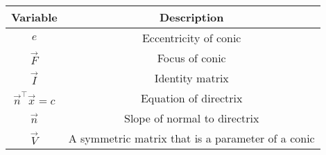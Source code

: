 \begin{tabular}[12pt]{ |c| c|}
    \hline
    \textbf{Variable} & \textbf{Description}\\ 
    \hline
	$e$ & Eccentricity of conic\\
	\hline
	$\vec{F}$ & Focus of conic\\
	\hline
	$\vec{I}$ & Identity matrix\\
	\hline
	$\vec{n}^{\top}\vec{x}=c$ & Equation of directrix\\
	\hline
	$\vec{n}$ & Slope of normal to directrix\\
	\hline
	$\vec{V}$ & A symmetric matrix that is a parameter of a conic\\
	\hline
\end{tabular}